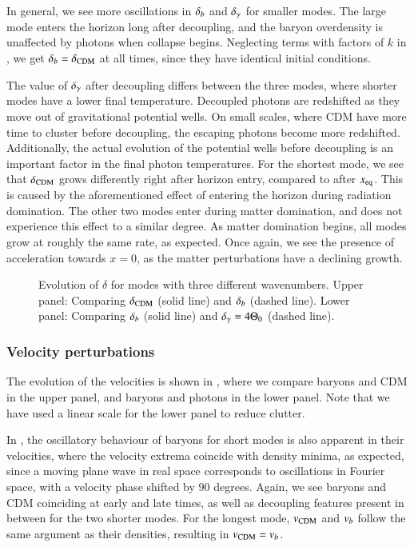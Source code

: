 In general, we see more oscillations in $\delta_b$ and $\delta_\gamma$ for smaller modes. The large mode enters the horizon long after decoupling, and the baryon overdensity is unaffected by photons when collapse begins. Neglecting terms with factors of $k$ in , we get $\delta_b=\delta_\mathrm{CDM}$ at all times, since they have identical initial conditions. 

The value of $\delta_\gamma$ after decoupling differs between the three modes, where shorter modes have a lower final temperature. Decoupled photons are redshifted as they move out of gravitational potential wells. On small scales, where CDM have more time to cluster before decoupling, the escaping photons become more redshifted. Additionally, the actual evolution of the potential wells before decoupling is an important factor in the final photon temperatures. For the shortest mode, we see that $\delta_\mathrm{CDM}$ grows differently right after horizon entry, compared to after $x_\mathrm{eq}$. This is caused by the aforementioned effect of entering the horizon during radiation domination. The other two modes enter during matter domination, and does not experience this effect to a similar degree. As matter domination begins, all modes grow at roughly the same rate, as expected. Once again, we see the presence of acceleration towards $x=0$, as the matter perturbations have a declining growth. 

\begin{figure}[ht!]
    \caption{Evolution of $\delta$ for modes with three different wavenumbers. Upper panel: Comparing $\delta_\mathrm{CDM}$ (solid line) and $\delta_b$ (dashed line). Lower panel: Comparing $\delta_b$ (solid line) and $\delta_\gamma=4\Theta_0$ (dashed line).}
    \label{fig:M3:results:deltas}
\end{figure}


\subsubsection{Velocity perturbations}\label{sssec:M3:results:velocity_perturbations}
The evolution of the velocities is shown in , where we compare baryons and CDM in the upper panel, and baryons and photons in the lower panel. Note that we have used a linear scale for the lower panel to reduce clutter.   

In , the oscillatory behaviour of baryons for short modes is also apparent in their velocities, where the velocity extrema coincide with density minima, as expected, since a moving plane wave in real space corresponds to oscillations in Fourier space, with a velocity phase shifted by $90$ degrees. Again, we see baryons and CDM coinciding at early and late times, as well as decoupling features present in between for the two shorter modes. For the longest mode, $v_\mathrm{CDM}$ and $v_b$ follow the same argument as their densities, resulting in $v_\mathrm{CDM}=v_b$. 

